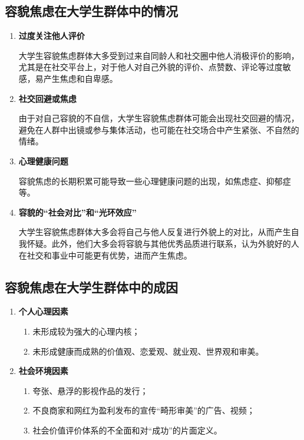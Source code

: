 \subsection{容貌焦虑在大学生群体中的情况}
\begin{enumerate}[leftmargin=7em]
    \item \textbf{过度关注他人评价}

    大学生容貌焦虑群体大多受到过来自同龄人和社交圈中他人消极评价的影响，尤其是在社交平台上，对于他人对自己外貌的评价、点赞数、评论等过度敏感，易产生焦虑和自卑感。

    \item \textbf{社交回避或焦虑}

    由于对自己容貌的不自信，大学生容貌焦虑群体可能会出现社交回避的情况，避免在人群中出镜或参与集体活动，也可能在社交场合中产生紧张、不自然的情绪。

    \item \textbf{心理健康问题}

    容貌焦虑的长期积累可能导致一些心理健康问题的出现，如焦虑症、抑郁症等。

    \item \textbf{容貌的``社会对比''和``光环效应''}

    大学生容貌焦虑群体大多会将自己与他人反复进行外貌上的对比，从而产生自我怀疑。此外，他们大多会将容貌与其他优秀品质进行联系，认为外貌好的人在社交和事业中可能更有优势，进而产生焦虑。

\end{enumerate}

\subsection{容貌焦虑在大学生群体中的成因}
\begin{enumerate}[leftmargin=7em]
    \item \textbf{个人心理因素}
        \begin{enumerate}
            \item 未形成较为强大的心理内核；
            \item 未形成健康而成熟的价值观、恋爱观、就业观、世界观和审美。
        \end{enumerate}
    \item \textbf{社会环境因素}
        \begin{enumerate}
            \item 夸张、悬浮的影视作品的发行；
            \item 不良商家和网红为盈利发布的宣传``畸形审美''的广告、视频\autocite{__2022-4}；
            \item 社会价值评价体系的不全面和对``成功''的片面定义。
        \end{enumerate}
\end{enumerate}

